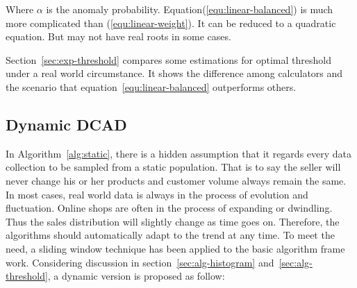 \documentclass[a4paper]{IEEEtran}
\begin{document}
			Where $\alpha$ is the anomaly probability. Equation(\ref{equ:linear-balanced}) is much more complicated than (\ref{equ:linear-weight}). It can be reduced to a quadratic equation. But may not have real roots in some cases.
			
			Section~\ref{sec:exp-threshold} compares some estimations for optimal threshold under a real world circumstance. It shows the difference among calculators and the scenario that equation~\ref{equ:linear-balanced} outperforms others.
			
			
			
		
		\subsection{Dynamic DCAD}\label{sec:alg-dynamic}
			In Algorithm~\ref{alg:static}, there is a hidden assumption that it regards every data collection to be sampled from a static population. That is to say the seller will never change his or her products and customer volume always remain the same. In most cases, real world data is always in the process of evolution and fluctuation. Online shops are often in the process of expanding or dwindling. Thus the sales distribution will slightly change as time goes on. Therefore, the algorithms should automatically adapt to the trend at any time. To meet the need, a sliding window technique has been applied to the basic algorithm frame work. Considering discussion in section~\ref{sec:alg-histogram} and~\ref{sec:alg-threshold}, a dynamic version is proposed as follow:
			
\end{document}
